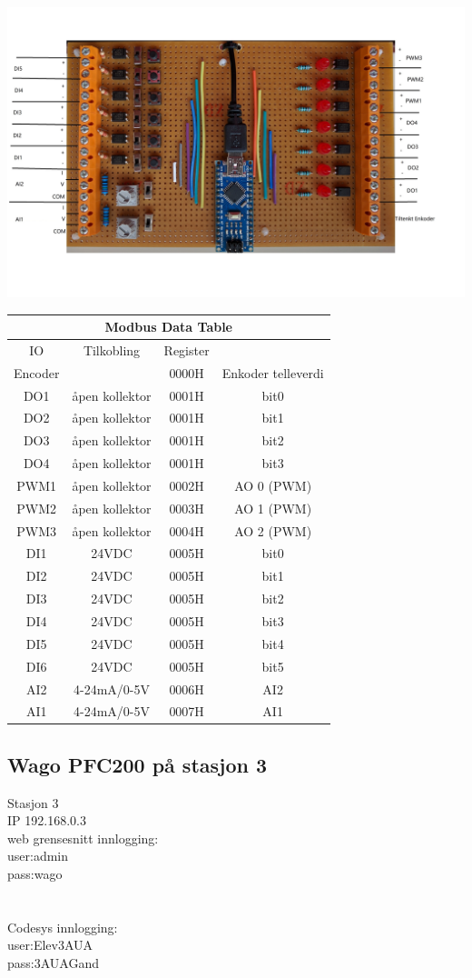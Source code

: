 \includegraphics[width=1\textwidth]{./GandRioTrainer.jpg}
\small
\begin{tabular}{|c|c|c|c|}
\hline 
\multicolumn{4}{|c|}{Modbus Data Table}\tabularnewline
\hline 
\hline 
IO & Tilkobling & Register & \tabularnewline
\hline 
Encoder &  & 0000H & Enkoder telleverdi\tabularnewline
\hline 
DO1 & åpen kollektor & 0001H & bit0\tabularnewline
\hline 
DO2 & åpen kollektor & 0001H & bit1\tabularnewline
\hline 
DO3 & åpen kollektor & 0001H & bit2\tabularnewline
\hline 
DO4 & åpen kollektor & 0001H & bit3\tabularnewline
\hline 
PWM1 & åpen kollektor & 0002H & AO 0 (PWM)\tabularnewline
\hline 
PWM2 & åpen kollektor & 0003H & AO 1 (PWM)\tabularnewline
\hline 
PWM3 & åpen kollektor & 0004H & AO 2 (PWM)\tabularnewline
\hline 
DI1 & 24VDC & 0005H & bit0\tabularnewline
\hline 
DI2 & 24VDC & 0005H & bit1\tabularnewline
\hline 
DI3 & 24VDC & 0005H & bit2\tabularnewline
\hline 
DI4 & 24VDC & 0005H & bit3\tabularnewline
\hline 
DI5 & 24VDC & 0005H & bit4\tabularnewline
\hline 
DI6 & 24VDC & 0005H & bit5\tabularnewline
\hline 
AI2 & 4-24mA/0-5V & 0006H & AI2\tabularnewline
\hline 
AI1 & 4-24mA/0-5V & 0007H & AI1\tabularnewline
\hline 
\end{tabular}
\normalsize
\vfil \eject
\subsection{Wago PFC200 på stasjon 3}

Stasjon 3 \\
IP 192.168.0.3\\
web grensesnitt innlogging:\\
user:admin\\
pass:wago\\
\\\\
Codesys innlogging:\\
user:Elev3AUA\\
pass:3AUAGand\\
